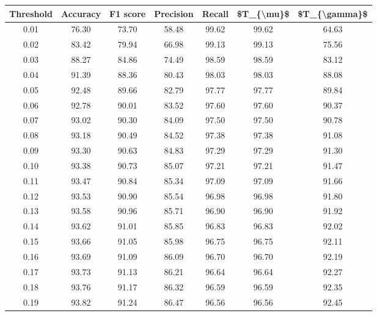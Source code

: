 \begin{tabular}{|c|c|c|c|c|c|c|}
\toprule
 Threshold &  Accuracy &  F1 score &  Precision &  Recall &  \$T\_\{\textbackslash mu\}\$ &  \$T\_\{\textbackslash gamma\}\$ \\
\hline
      0.01 &     76.30 &     73.70 &      58.48 &   99.62 &      99.62 &         64.63 \\
      0.02 &     83.42 &     79.94 &      66.98 &   99.13 &      99.13 &         75.56 \\
      0.03 &     88.27 &     84.86 &      74.49 &   98.59 &      98.59 &         83.12 \\
      0.04 &     91.39 &     88.36 &      80.43 &   98.03 &      98.03 &         88.08 \\
      0.05 &     92.48 &     89.66 &      82.79 &   97.77 &      97.77 &         89.84 \\
      0.06 &     92.78 &     90.01 &      83.52 &   97.60 &      97.60 &         90.37 \\
      0.07 &     93.02 &     90.30 &      84.09 &   97.50 &      97.50 &         90.78 \\
      0.08 &     93.18 &     90.49 &      84.52 &   97.38 &      97.38 &         91.08 \\
      0.09 &     93.30 &     90.63 &      84.83 &   97.29 &      97.29 &         91.30 \\
      0.10 &     93.38 &     90.73 &      85.07 &   97.21 &      97.21 &         91.47 \\
      0.11 &     93.47 &     90.84 &      85.34 &   97.09 &      97.09 &         91.66 \\
      0.12 &     93.53 &     90.90 &      85.54 &   96.98 &      96.98 &         91.80 \\
      0.13 &     93.58 &     90.96 &      85.71 &   96.90 &      96.90 &         91.92 \\
      0.14 &     93.62 &     91.01 &      85.85 &   96.83 &      96.83 &         92.02 \\
      0.15 &     93.66 &     91.05 &      85.98 &   96.75 &      96.75 &         92.11 \\
      0.16 &     93.69 &     91.09 &      86.09 &   96.70 &      96.70 &         92.19 \\
      0.17 &     93.73 &     91.13 &      86.21 &   96.64 &      96.64 &         92.27 \\
      0.18 &     93.76 &     91.17 &      86.32 &   96.59 &      96.59 &         92.35 \\
      0.19 &     93.82 &     91.24 &      86.47 &   96.56 &      96.56 &         92.45 \\

\end{tabular}
